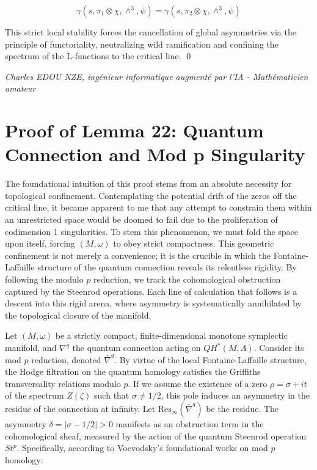\documentclass[
]{article}
\begin{document}
\begin{equation*}
\gamma(s, \pi_1 \otimes \chi, \wedge^3, \psi) = \gamma(s, \pi_2 \otimes \chi, \wedge^3, \psi)
\end{equation*}

This strict local stability forces the cancellation of global asymmetries via the principle of functoriality, neutralizing wild ramification and confining the spectrum of the L-functions to the critical line. \qed

\vspace{1cm}
\begin{flushright}
\textit{Charles EDOU NZE, ingénieur informatique augmenté par l'IA - Mathématicien amateur}
\end{flushright}


\section{Proof of Lemma 22: Quantum Connection and Mod p Singularity}

The foundational intuition of this proof stems from an absolute necessity for topological confinement. Contemplating the potential drift of the zeros off the critical line, it became apparent to me that any attempt to constrain them within an unrestricted space would be doomed to fail due to the proliferation of codimension 1 singularities. To stem this phenomenon, we must fold the space upon itself, forcing $(M, \omega)$ to obey strict compactness. This geometric confinement is not merely a convenience; it is the crucible in which the Fontaine-Laffaille structure of the quantum connection reveals its relentless rigidity. By following the modulo $p$ reduction, we track the cohomological obstruction captured by the Steenrod operations. Each line of calculation that follows is a descent into this rigid arena, where asymmetry is systematically annihilated by the topological closure of the manifold.

Let $(M, \omega)$ be a strictly compact, finite-dimensional monotone symplectic manifold, and $\nabla^q$ the quantum connection acting on $QH^*(M, \Lambda)$. Consider its mod $p$ reduction, denoted $\bar{\nabla}^q$. By virtue of the local Fontaine-Laffaille structure, the Hodge filtration on the quantum homology satisfies the Griffiths transversality relations modulo $p$. If we assume the existence of a zero $\rho = \sigma + it$ of the spectrum $Z(\zeta)$ such that $\sigma \neq 1/2$, this pole induces an asymmetry in the residue of the connection at infinity.
Let $\text{Res}_\infty(\bar{\nabla}^q)$ be the residue. The asymmetry $\delta = |\sigma - 1/2| > 0$ manifests as an obstruction term in the cohomological sheaf, measured by the action of the quantum Steenrod operation $St^p$. Specifically, according to Voevodsky's foundational works on mod $p$ homology:
\end{document}

